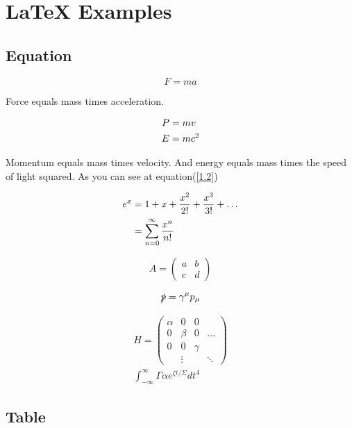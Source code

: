 \documentclass[letterpaper,12pt]{article}
\begin{document}
\section{\LaTeX{} Examples}

\subsection{Equation}

\begin{equation}\label{1.1}
    F = ma
\end{equation}

Force equals mass times acceleration.

\begin{align}
    P &= mv\label{1.2}\\
    E &= mc^2\notag
\end{align}

Momentum equals mass times velocity.
And energy equals mass times the speed of light squared.
As you can see at equation(\ref{1.2}) ~~~

\begin{align}
    e^x &= 1+x+\frac{x^2}{2!}+\frac{x^3}{3!}+\dots\notag\\
    &= \sum^\infty_{n=0} \frac{x^n}{n!}
\end{align}

\begin{equation}
    A = \begin{pmatrix} a & b \\ c & d \end{pmatrix}
\end{equation}

\begin{equation}
        \slashed{p} = \gamma^\mu p_\mu
\end{equation}

\begin{align}
    H = \begin{pmatrix}
    \alpha & 0 & 0 & \\
    0 & \beta & 0 & \ldots \\
    0 & 0 & \gamma & \\
     & \vdots & & \ddots
    \end{pmatrix}\\
    \int^\infty_{-\infty}{\Gamma \alpha e^{\zeta t/\Sigma}dt^4}
\end{align}

\subsection{Table}
\end{document}
